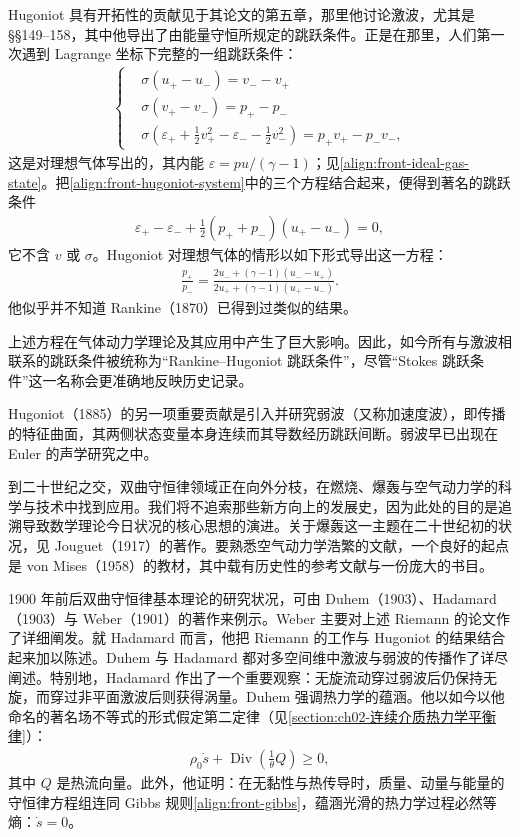 \documentclass[../../main.tex]{subfiles}
\begin{document}
Hugoniot 具有开拓性的贡献见于其论文的第五章，那里他讨论激波，尤其是 §§149--158，其中他导出了由能量守恒所规定的跳跃条件。正是在那里，人们第一次遇到 Lagrange 坐标下完整的一组跳跃条件：
\begin{align}
\left\{\begin{aligned}
&\sigma(u_+-u_-)=v_--v_+\\
&\sigma(v_+-v_-)=p_+-p_-\\
&\sigma\left(\varepsilon_++\frac{1}{2}v_+^{2}-\varepsilon_--\frac{1}{2}v_-^{2}\right)=p_+v_+-p_-v_-,
\end{aligned}\right.\label{align:front-hugoniot-system}
\end{align}
这是对理想气体写出的，其内能 $\varepsilon=pu/(\gamma-1)$；见\eqref{align:front-ideal-gas-state}。把\eqref{align:front-hugoniot-system}中的三个方程结合起来，便得到著名的跳跃条件
\begin{align}
\varepsilon_+-\varepsilon_-+\frac{1}{2}(p_++p_-)(u_+-u_-)=0,\label{align:front-hugoniot-condition}
\end{align}
它不含 $v$ 或 $\sigma$。Hugoniot 对理想气体的情形以如下形式导出这一方程：
\begin{align}
\frac{p_+}{p_-}=\frac{2u_-+(\gamma-1)(u_--u_+)}{2u_++(\gamma-1)(u_+-u_-)}.\label{align:front-hugoniot-isentrope}
\end{align}
他似乎并不知道 Rankine（1870）已得到过类似的结果。

上述方程在气体动力学理论及其应用中产生了巨大影响。因此，如今所有与激波相联系的跳跃条件被统称为“Rankine--Hugoniot 跳跃条件”，尽管“Stokes 跳跃条件”这一名称会更准确地反映历史记录。

Hugoniot（1885）的另一项重要贡献是引入并研究弱波（又称加速度波），即传播的特征曲面，其两侧状态变量本身连续而其导数经历跳跃间断。弱波早已出现在 Euler 的声学研究之中。

到二十世纪之交，双曲守恒律领域正在向外分枝，在燃烧、爆轰与空气动力学的科学与技术中找到应用。我们将不追索那些新方向上的发展史，因为此处的目的是追溯导致数学理论今日状况的核心思想的演进。关于爆轰这一主题在二十世纪初的状况，见 Jouguet（1917）的著作。要熟悉空气动力学浩繁的文献，一个良好的起点是 von Mises（1958）的教材，其中载有历史性的参考文献与一份庞大的书目。

1900 年前后双曲守恒律基本理论的研究状况，可由 Duhem（1903）、Hadamard（1903）与 Weber（1901）的著作来例示。Weber 主要对上述 Riemann 的论文作了详细阐发。就 Hadamard 而言，他把 Riemann 的工作与 Hugoniot 的结果结合起来加以陈述。Duhem 与 Hadamard 都对多空间维中激波与弱波的传播作了详尽阐述。特别地，Hadamard 作出了一个重要观察：无旋流动穿过弱波后仍保持无旋，而穿过非平面激波后则获得涡量。Duhem 强调热力学的蕴涵。他以如今以他命名的著名场不等式的形式假定第二定律（见\cref{section:ch02-连续介质热力学平衡律}）：
\begin{align}
\rho_0\dot{s}+\operatorname{Div}\left(\frac{1}{\theta}Q\right)\geqslant0,\label{align:front-duhem-inequality}
\end{align}
其中 $Q$ 是热流向量。此外，他证明：在无黏性与热传导时，质量、动量与能量的守恒律方程组连同 Gibbs 规则\eqref{align:front-gibbs}，蕴涵光滑的热力学过程必然等熵：$\dot{s}=0$。
\end{document}
